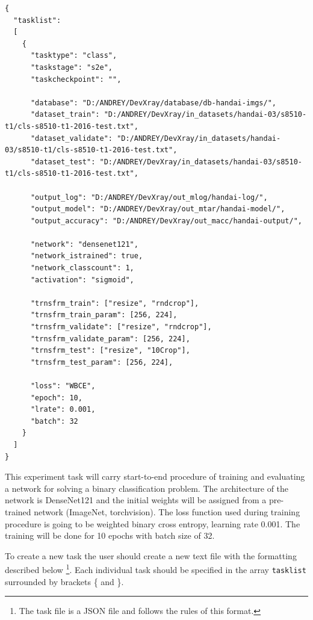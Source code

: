 \documentclass[a4paper, 11pt]{article}
\begin{document}
\begin{verbatim}
{
  "tasklist":
  [
    {
      "tasktype": "class",
      "taskstage": "s2e",
      "taskcheckpoint": "",

      "database": "D:/ANDREY/DevXray/database/db-handai-imgs/",
      "dataset_train": "D:/ANDREY/DevXray/in_datasets/handai-03/s8510-t1/cls-s8510-t1-2016-test.txt",
      "dataset_validate": "D:/ANDREY/DevXray/in_datasets/handai-03/s8510-t1/cls-s8510-t1-2016-test.txt",
      "dataset_test": "D:/ANDREY/DevXray/in_datasets/handai-03/s8510-t1/cls-s8510-t1-2016-test.txt",

      "output_log": "D:/ANDREY/DevXray/out_mlog/handai-log/",
      "output_model": "D:/ANDREY/DevXray/out_mtar/handai-model/",
      "output_accuracy": "D:/ANDREY/DevXray/out_macc/handai-output/",

      "network": "densenet121",
      "network_istrained": true,
      "network_classcount": 1,
      "activation": "sigmoid",

      "trnsfrm_train": ["resize", "rndcrop"],
      "trnsfrm_train_param": [256, 224],
      "trnsfrm_validate": ["resize", "rndcrop"],
      "trnsfrm_validate_param": [256, 224],
      "trnsfrm_test": ["resize", "10Crop"],
      "trnsfrm_test_param": [256, 224],

      "loss": "WBCE",
      "epoch": 10,
      "lrate": 0.001,
      "batch": 32
    }
  ]
}
\end{verbatim}

This experiment task will carry start-to-end procedure of training and evaluating a network for solving a binary classification problem. The architecture of the network is DenseNet121 and the initial weights will be assigned from a pre-trained network (ImageNet, torchvision). The loss function used during training procedure is going to be weighted binary cross entropy, learning rate 0.001. The training will be done for 10 epochs with batch size of 32.

To create a new task the user should create a new text file with the formatting described below \footnote{The task file is a JSON file and follows the rules of this format.}.
Each individual task should be specified in the array \texttt{tasklist} surrounded by brackets \{ and \}.
\end{document}
